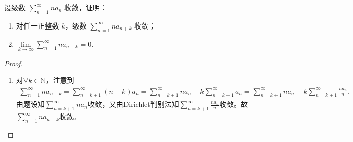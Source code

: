 \documentclass[../../main.tex]{subfiles}%
\begin{document}
\begin{example}
设级数 $\sum\limits_{n=1}^{\infty} na_n$ 收敛，证明：
\begin{enumerate}[(1)]
\item 对任一正整数 $k$，级数 $\sum\limits_{n=1}^{\infty} na_{n+k}$ 收敛；
\item $\lim\limits_{k\to\infty} \sum\limits_{n=1}^{\infty} na_{n+k} = 0.$
\end{enumerate}
\end{example}
\begin{proof}
\begin{enumerate}[(1)]
\item 对$\forall k\in \mathbb{N}$，注意到
\begin{align*}
\sum\limits_{n=1}^{\infty} n a_{n+k} = \sum\limits_{n=k+1}^{\infty} (n-k) a_n = \sum\limits_{n=k+1}^{\infty} n a_n - k \sum\limits_{n=k+1}^{\infty} a_n = \sum\limits_{n=k+1}^{\infty} n a_n - k \sum\limits_{n=k+1}^{\infty} \frac{n a_n}{n}.
\end{align*}
由题设知$\sum\limits_{n=k+1}^{\infty} n a_n$收敛，又由Dirichlet判别法知$\sum\limits_{n=k+1}^{\infty} \frac{n a_n}{n}$收敛。故$\sum\limits_{n=1}^{\infty} n a_{n+k}$收敛。


\end{enumerate}
\end{proof}
\end{document}
